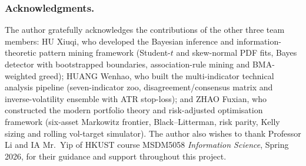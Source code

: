 \documentclass[runningheads]{llncs}
\begin{document}
\subsubsection*{Acknowledgments.}
The author gratefully acknowledges the contributions of the other three
team members:
HU Xiuqi, who developed the Bayesian inference and information-theoretic
pattern mining framework (Student-$t$ and skew-normal PDF fits, Bayes
detector with bootstrapped boundaries, association-rule mining and
BMA-weighted greed);
HUANG Wenhao, who built the multi-indicator technical analysis pipeline
(seven-indicator zoo, disagreement/consensus matrix and inverse-volatility
ensemble with ATR stop-loss);
and ZHAO Fuxian, who constructed the modern portfolio theory and
risk-adjusted optimisation framework (six-asset Markowitz frontier,
Black--Litterman, risk parity, Kelly sizing and rolling vol-target
simulator).
The author also wishes to thank Professor Li and IA Mr.\ Yip of HKUST
course MSDM5058 \emph{Information Science}, Spring 2026, for their
guidance and support throughout this project.



\end{document}
